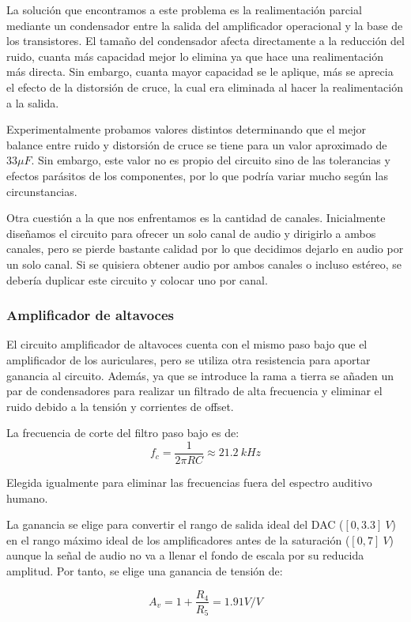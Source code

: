 La solución que encontramos a este problema es la realimentación parcial mediante un condensador entre la salida del amplificador operacional y la base de los transistores. El tamaño del condensador afecta directamente a la reducción del ruido, cuanta más capacidad mejor lo elimina ya que hace una realimentación más directa. Sin embargo, cuanta mayor capacidad se le aplique, más se aprecia el efecto de la distorsión de cruce, la cual era eliminada al hacer la realimentación a la salida.

Experimentalmente probamos valores distintos determinando que el mejor balance entre ruido y distorsión de cruce se tiene para un valor aproximado de $33 \mu F$. Sin embargo, este valor no es propio del circuito sino de las tolerancias y efectos parásitos de los componentes, por lo que podría variar mucho según las circunstancias.

Otra cuestión a la que nos enfrentamos es la cantidad de canales. Inicialmente diseñamos el circuito para ofrecer un solo canal de audio y dirigirlo a ambos canales, pero se pierde bastante calidad por lo que decidimos dejarlo en audio por un solo canal. Si se quisiera obtener audio por ambos canales o incluso estéreo, se debería duplicar este circuito y colocar uno por canal.

\subsubsection{Amplificador de altavoces}

El circuito amplificador de altavoces cuenta con el mismo paso bajo que el amplificador de los auriculares, pero se utiliza otra resistencia para aportar ganancia al circuito. Además, ya que se introduce la rama a tierra se añaden un par de condensadores para realizar un filtrado de alta frecuencia y eliminar el ruido debido a la tensión y corrientes de offset.

La frecuencia de corte del filtro paso bajo es de:
\[
    f_c = \frac{1}{2\pi RC} \approx 21.2\ kHz
\]

Elegida igualmente para eliminar las frecuencias fuera del espectro auditivo humano.

La ganancia se elige para convertir el rango de salida ideal del DAC ($[0, 3.3]\ V$) en el rango máximo ideal de los amplificadores antes de la saturación ($[0, 7]\ V$) aunque la señal de audio no va a llenar el fondo de escala por su reducida amplitud. Por tanto, se elige una ganancia de tensión de:

\[
    A_v = 1 + \frac{R_4}{R_5} = 1.91 V/V
\]

